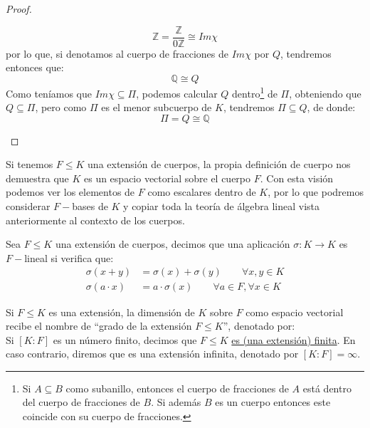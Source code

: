 \begin{prop}
\begin{proof}
\begin{description}
\begin{equation*}
                    \mathbb{Z} = \frac{\mathbb{Z}}{0\mathbb{Z}} \cong Im\chi
                \end{equation*}
                por lo que, si denotamos al cuerpo de fracciones de $Im\chi$ por $Q$, tendremos entonces que:
                \begin{equation*}
                    \mathbb{Q}\cong Q
                \end{equation*}
                Como teníamos que $Im\chi \subseteq \Pi$, podemos calcular $Q$ dentro\footnote{Si $A\subseteq B$ como subanillo, entonces el cuerpo de fracciones de $A$ está dentro del cuerpo de fracciones de $B$. Si además $B$ es un cuerpo entonces este coincide con su cuerpo de fracciones.} de $\Pi$, obteniendo que $Q\subseteq \Pi$, pero como $\Pi$ es el menor subcuerpo de $K$, tendremos $\Pi\subseteq Q$, de donde:
                \begin{equation*}
                    \Pi = Q\cong \mathbb{Q}
                \end{equation*}
        \end{description}
    \end{proof}
\end{prop}

\begin{observacion}
    Si tenemos $F\leq K$ una extensión de cuerpos, la propia definición de cuerpo nos demuestra que $K$ es un espacio vectorial sobre el cuerpo $F$. Con esta visión podemos ver los elementos de $F$ como escalares dentro de $K$, por lo que podremos considerar $F-$bases de $K$ y copiar toda la teoría de álgebra lineal vista anteriormente al contexto de los cuerpos.
\end{observacion}

\begin{definicion}
    Sea $F\leq K$ una extensión de cuerpos, decimos que una aplicación $\sigma:K\to K$ es $F-$lineal si verifica que:
    \begin{align*}
        \sigma(x+y) &= \sigma(x) + \sigma(y) \qquad \forall x,y\in K \\
        \sigma(a\cdot x) &= a\cdot \sigma(x) \qquad \forall a\in F, \forall x\in K
    \end{align*}
\end{definicion}

\begin{definicion}
    Si $F\leq K$ es una extensión, la dimensión de $K$ sobre $F$ como espacio vectorial recibe el nombre de ``grado de la extensión $F\leq K$'', denotado por: 
    \begin{equation*}
        [K:F]
    \end{equation*}
    Si $[K:F]$ es un número finito, decimos que $F\leq K$ \underline{es (una extensión) finita}. En caso contrario, diremos que es una extensión infinita, denotado por $[K:F] = \infty$.
\end{definicion}

